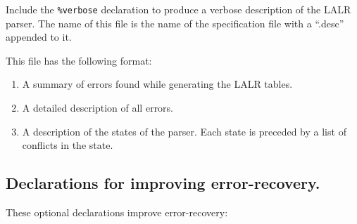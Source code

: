 \begin{description}
Include the {\tt \%verbose} declaration to produce a verbose
description of the LALR parser.   The name of this file is
the name of the specification file with a ``.desc'' appended to it.

     This file has the following format:
\begin{enumerate}

\item A summary of errors found while generating the LALR tables.
\item A detailed description of all errors.
\item A description of the states of the parser.  Each state
        is preceded by a list of conflicts in the state.

\end{enumerate}
\end{description}

\subsection{Declarations for improving error-recovery.}

These optional declarations improve error-recovery:

